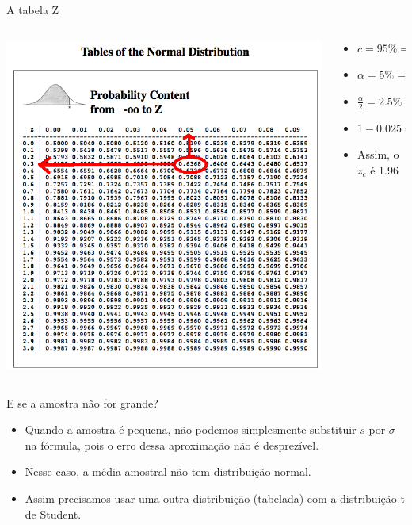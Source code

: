 \documentclass{beamer}
\begin{document}
\begin{frame}{A tabela Z}
  \begin{columns}
    \begin{column}{7cm}
    \includegraphics[height=0.9\textheight]{z_table}
    \end{column}
    \begin{column}{5cm}
      \begin{itemize}
      \item $c=95\% = 0.95$
      \item $\alpha = 5\% = 0.05$

      \item $\frac{\alpha}{2} = 2.5\% = 0.0250$

      \item $1-0.025 = 0.9750$%

      \item Assim, o $z_c$ é 1.96

      \end{itemize}
    \end{column}
  \end{columns}
\end{frame}

\begin{frame}{E se a amostra não for grande?}
  \begin{itemize}
  \item Quando a amostra é pequena, não podemos simplesmente
    substituir $s$ por $\sigma$ na fórmula, pois o erro dessa
    aproximação não é desprezível.
  \item Nesse caso, a média amostral não tem distribuição normal.
  \item Assim precisamos usar uma outra distribuição (tabelada) com a
    distribuição \alert{t de Student}.
  \end{itemize}
\end{frame}
\end{document}
